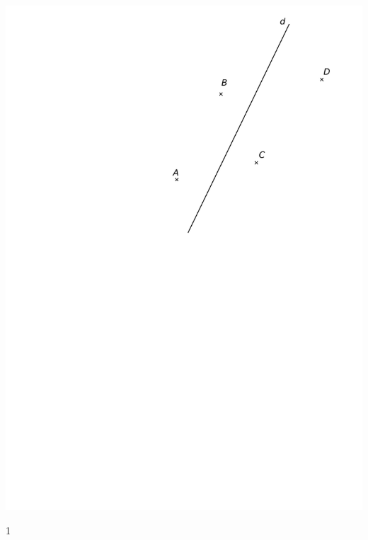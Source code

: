 \documentclass[a4paper,11pt]{report}
\begin{document}
\begin{exop}
{\begin{minipage}[t]{0.5\textwidth}{
	\vspace{0pt}
\begin{center}
\includegraphics[scale=0.7]{media/es-11/13-14}
\end{center}	}
	\end{minipage}
}
{1}
\end{exop}

\newpage
\end{document}
